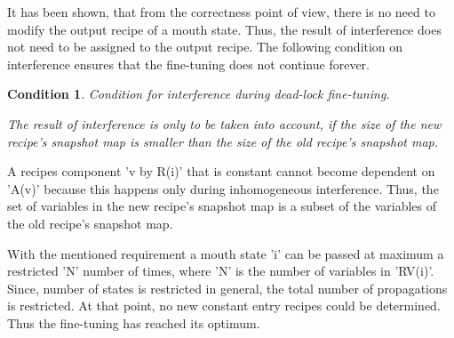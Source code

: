 \documentclass[12pt]{article}
\newtheorem{condition}{Condition}
\begin{document}
It has been shown, that from the correctness point of view, there is no need to
modify the output recipe of a mouth state. Thus, the result of interference
does not need to be assigned to the output recipe. The following condition 
on interference ensures that the fine-tuning does not continue forever.

\begin{condition}
Condition for interference during dead-lock fine-tuning.

The result of interference is only to be taken into account, if the
size of the new recipe's snapshot map is smaller than the size of 
the old recipe's snapshot map. 
\end{condition}

A recipes component 'v by R(i)' that is constant cannot become dependent on
'A(v)' because this happens only during inhomogeneous interference. Thus, the
set of variables in the new recipe's snapshot map is a subset of the variables
of the old recipe's snapshot map.

With the mentioned requirement a mouth state 'i' can be passed at maximum a
restricted 'N' number of times, where 'N' is the number of variables in
'RV(i)'. Since, number of states is restricted in general, the total number of
propagations is restricted. At that point, no new constant entry recipes could
be determined. Thus the fine-tuning has reached its optimum.
\end{document}
